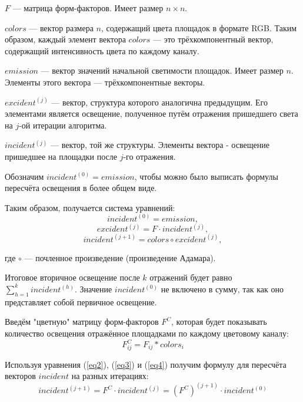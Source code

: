 \documentclass[12pt,fleqn]{article}
\begin{document}
$F$ --- матрица форм-факторов. Имеет размер $n \times n$.

$colors$ --- вектор размера $n$, содержащий цвета площадок в формате RGB. Таким образом, каждый элемент вектора $colors$ --- это трёхкомпонентный вектор, содержащий интенсивность цвета по каждому каналу.

$emission$ --- вектор значений начальной светимости площадок. Имеет размер $n$. Элементы этого вектора --- трёхкомпонентные векторы.

$excident^{(j)}$ --- вектор, структура которого аналогична предыдущим. Его элементами является освещение, полученное путём отражения пришедшего света на $j$-ой итерации алгоритма.

$incident^{(j)}$ --- вектор, той же структуры. Элементы вектора - освещение пришедшее на площадки после $j$-го отражения.

Обозначим $incident^{(0)} = emission$, чтобы можно было выписать формулы пересчёта освещения в более общем виде.

Таким образом, получается система уравнений:
\begin{equation}
\label{eq1}
incident^{(0)} = emission,
\end{equation}
\begin{equation}
\label{eq2}
excident^{(j)} = F \cdot incident^{(j)},
\end{equation}
\begin{equation}
\label{eq3}
incident^{(j + 1)} = colors \circ excident^{(j)},
\end{equation}

где $\circ$ --- почленное произведение (произведение Адамара).

Итоговое вторичное освещение после $k$ отражений будет равно
$\sum\limits_{h = 1}^k incident^{(h)}$.
Значение $incident^{(0)}$ не включено в сумму, так как оно представляет собой первичное освещение.

Введём "цветную" матрицу форм-факторов $F^C$, которая будет показывать количество освещения отражённое площадками по каждому цветовому каналу:
\begin{equation}
\label{eq4}
F^C_{ij} = F_{ij} * colors_i
\end{equation}

Используя уравнения (\ref{eq2}), (\ref{eq3}) и (\ref{eq4}) получим формулу для пересчёта векторов $incident$ на разных итерациях:
\begin{equation}
\label{eq5}
incident^{(j + 1)} = F^C \cdot incident^{(j)} = \left( F^C \right) ^ {(j + 1)} \cdot incident^{(0)}
\end{equation}
\end{document}
